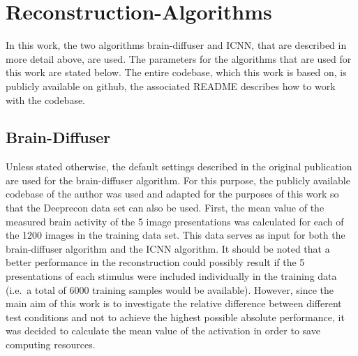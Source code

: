 

\section{Reconstruction-Algorithms}

In this work, the two algorithms brain-diffuser\cite{ozcelikNaturalSceneReconstruction2023} and ICNN\cite{shenDeepImageReconstruction2019}, that are described in more detail above, are used. The parameters for the algorithms that are used for this work are stated below. The entire codebase, which this work is based on, is publicly available on github\cite{mildenbergerKamitaniLabBrain_diffuser}, the associated README describes how to work with the codebase. 

\subsection{Brain-Diffuser}
Unless stated otherwise, the default settings described in the original publication are used for the brain-diffuser algorithm. For this purpose, the publicly available codebase of the author\cite{ozcelikOzcelikfuBraindiffuser2025} was used and adapted for the purposes of this work so that the Deeprecon data set can also be used.
First, the mean value of the measured brain activity of the 5 image presentations was calculated for each of the 1200 images in the training data set. This data serves as input for both the brain-diffuser algorithm and the ICNN algorithm. It should be noted that a better performance in the reconstruction could possibly result if the 5 presentations of each stimulus were included individually in the training data (i.e.\ a total of 6000 training samples would be available). However, since the main aim of this work is to investigate the relative difference between different test conditions and not to achieve the highest possible absolute performance, it was decided to calculate the mean value of the activation in order to save computing resources.

